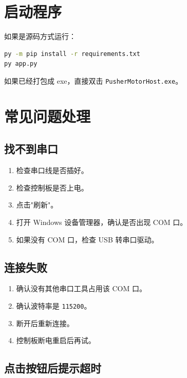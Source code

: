 \appendix

\section{启动程序}

如果是源码方式运行：

\begin{lstlisting}[language=bash, caption={源码启动命令}, label={lst:start-source}]
py -m pip install -r requirements.txt
py app.py
\end{lstlisting}

如果已经打包成 exe，直接双击 \texttt{PusherMotorHost.exe}。

\section{常见问题处理}

\subsection{找不到串口}

\begin{enumerate}[label={(\arabic*)}]
    \item 检查串口线是否插好。
    \item 检查控制板是否上电。
    \item 点击"刷新"。
    \item 打开 Windows 设备管理器，确认是否出现 COM 口。
    \item 如果没有 COM 口，检查 USB 转串口驱动。
\end{enumerate}

\subsection{连接失败}

\begin{enumerate}[label={(\arabic*)}]
    \item 确认没有其他串口工具占用该 COM 口。
    \item 确认波特率是 \texttt{115200}。
    \item 断开后重新连接。
    \item 控制板断电重启后再试。
\end{enumerate}

\subsection{点击按钮后提示超时}

